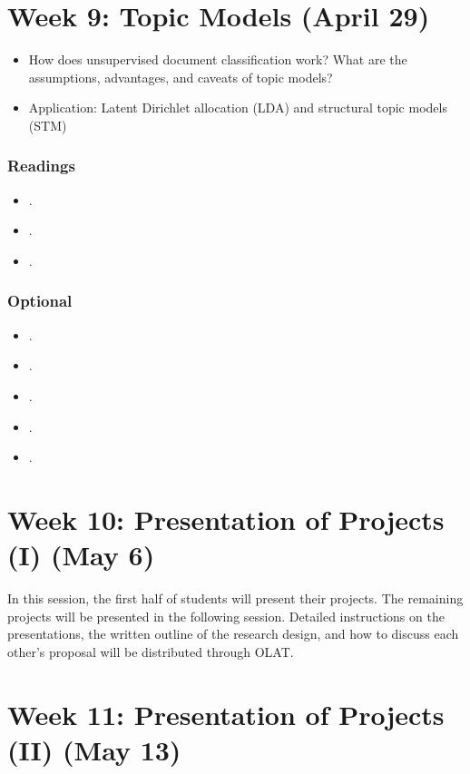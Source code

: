 \documentclass[abstract=on,parskip=full,headings=standardclasses,fontsize=11pt,paper=a4]{scrartcl}
\begin{document}
\section{Week 9: Topic Models (April 29)}

\begin{itemize}
\item How does unsupervised document classification work? What are the assumptions, advantages, and caveats of topic models? 
\item Application: Latent Dirichlet allocation (LDA) and structural topic models (STM)
\end{itemize}

\subsubsection*{Readings}
\begin{itemize}
\item {}.
\item {}.
\item {}.
\end{itemize}


\subsubsection*{Optional}
\begin{itemize}
\item {}.
\item {}.
\item {}.
\item {}.
\item {}.
\end{itemize}

\section{Week 10: Presentation of Projects (I) (May 6)}

In this session, the first half of students will present their projects. The remaining projects will be presented in the following session. Detailed instructions on the presentations, the written outline of the research design, and how to discuss each other's proposal will be distributed through OLAT.


\section{Week 11: Presentation of Projects (II) (May 13)}
\end{document}
